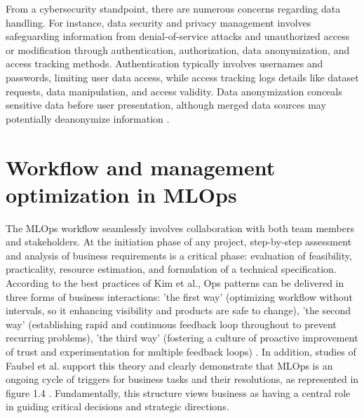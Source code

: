 From a cybersecurity standpoint, there are numerous concerns regarding data handling. For instance, data security and privacy management involves safeguarding information from denial-of-service attacks and unauthorized access or modification through authentication, authorization, data anonymization, and access tracking methods. Authentication typically involves usernames and passwords, limiting user data access, while access tracking logs details like dataset requests, data manipulation, and access validity. Data anonymization conceals sensitive data before user presentation, although merged data sources may potentially deanonymize information \cite{davoudian_a_2020}.


\section[Workflow and management optimization in MLOps]{Workflow and management optimization in MLOps}
The MLOps workflow seamlessly involves collaboration with both team members and stakeholders. At the initiation phase of any project, step-by-step assessment and analysis of business requirements is a critical phase: evaluation of feasibility, practicality, resource estimation, and formulation of a technical specification. According to the best practices of Kim et al., Ops patterns can be delivered in three forms of business interactions: 'the first way' (optimizing workflow without intervals, so it enhancing visibility and products are safe to change), 'the second way' (establishing rapid and continuous feedback loop throughout to prevent recurring problems), 'the third way' (fostering a culture of proactive improvement of trust and experimentation for multiple feedback loops) \cite{kim_g_2016}. In addition, studies of Faubel et al. support this theory and clearly demonstrate that MLOps is an ongoing cycle of triggers for business tasks and their resolutions, as represented in figure 1.4 \cite{faubel_l_2023}. Fundamentally, this structure views business as having a central role in guiding critical decisions and strategic directions.

